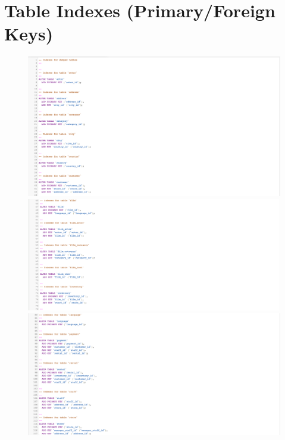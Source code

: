 \documentclass{article}
\begin{document}
\section{Table Indexes (Primary/Foreign Keys)}
	\begin{figure}[H]
		\includegraphics[width=\textwidth]{tableindexkeys1}
		\includegraphics[width=\textwidth]{tableindexkeys2}
		\includegraphics[width=\textwidth]{tableindexkeys3}
	\end{figure}	
\end{document}
